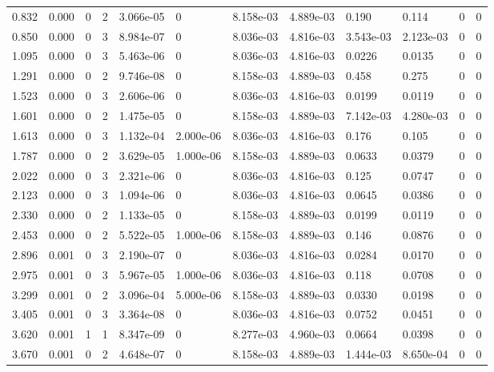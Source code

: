 \documentclass[preview]{standalone}
\begin{document}
{{\begin{tabular}{L{1.2cm}C{1.2cm} C{0.3cm}C{0.5cm} C{1.4cm}C{1.4cm} C{1.4cm}C{1.4cm} C{1.6cm}C{1.6cm} C{1.6cm}C{1.6cm}}
  0.832  &  0.000  & 0     &  2 &  3.066e-05  & 0  &  8.158e-03&   4.889e-03& 0.190 & 0.114   &  0 & 0  \\ 
  0.850  &  0.000  & 0     &  3 &  8.984e-07  & 0  &  8.036e-03&   4.816e-03& 3.543e-03 & 2.123e-03   &  0 & 0  \\ 
  1.095  &  0.000  & 0     &  3 &  5.463e-06  & 0  &  8.036e-03&   4.816e-03& 0.0226 & 0.0135   &  0 & 0  \\ 
  1.291  &  0.000  & 0     &  2 &  9.746e-08  & 0  &  8.158e-03&   4.889e-03& 0.458 & 0.275   &  0 & 0  \\ 
  1.523  &  0.000  & 0     &  3 &  2.606e-06  & 0  &  8.036e-03&   4.816e-03& 0.0199 & 0.0119   &  0 & 0  \\ 
  1.601  &  0.000  & 0     &  2 &  1.475e-05  & 0  &  8.158e-03&   4.889e-03& 7.142e-03 & 4.280e-03   &  0 & 0  \\ 
  1.613  &  0.000  & 0     &  3 &  1.132e-04  & 2.000e-06  &  8.036e-03&   4.816e-03& 0.176 & 0.105   &  0 & 0  \\ 
  1.787  &  0.000  & 0     &  2 &  3.629e-05  & 1.000e-06  &  8.158e-03&   4.889e-03& 0.0633 & 0.0379   &  0 & 0  \\ 
  2.022  &  0.000  & 0     &  3 &  2.321e-06  & 0  &  8.036e-03&   4.816e-03& 0.125 & 0.0747   &  0 & 0  \\ 
  2.123  &  0.000  & 0     &  3 &  1.094e-06  & 0  &  8.036e-03&   4.816e-03& 0.0645 & 0.0386   &  0 & 0  \\ 
  2.330  &  0.000  & 0     &  2 &  1.133e-05  & 0  &  8.158e-03&   4.889e-03& 0.0199 & 0.0119   &  0 & 0  \\ 
  2.453  &  0.000  & 0     &  2 &  5.522e-05  & 1.000e-06  &  8.158e-03&   4.889e-03& 0.146 & 0.0876   &  0 & 0  \\ 
  2.896  &  0.001  & 0     &  3 &  2.190e-07  & 0  &  8.036e-03&   4.816e-03& 0.0284 & 0.0170   &  0 & 0  \\ 
  2.975  &  0.001  & 0     &  3 &  5.967e-05  & 1.000e-06  &  8.036e-03&   4.816e-03& 0.118 & 0.0708   &  0 & 0  \\ 
  3.299  &  0.001  & 0     &  2 &  3.096e-04  & 5.000e-06  &  8.158e-03&   4.889e-03& 0.0330 & 0.0198   &  0 & 0  \\ 
  3.405  &  0.001  & 0     &  3 &  3.364e-08  & 0  &  8.036e-03&   4.816e-03& 0.0752 & 0.0451   &  0 & 0  \\ 
  3.620  &  0.001  & 1     &  1 &  8.347e-09  & 0  &  8.277e-03&   4.960e-03& 0.0664 & 0.0398   &  0 & 0  \\ 
  3.670  &  0.001  & 0     &  2 &  4.648e-07  & 0  &  8.158e-03&   4.889e-03& 1.444e-03 & 8.650e-04   &  0 & 0  \\ 

\end{tabular}}}
\end{document}
